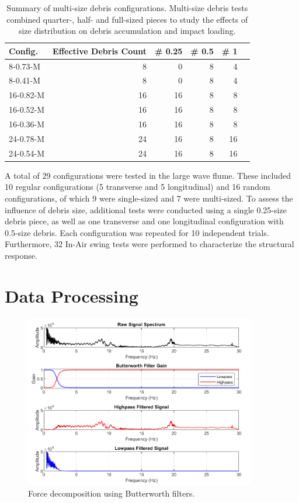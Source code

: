 \documentclass{article}
\begin{document}
{\begin{table}[h!]
\centering
\caption{Summary of multi-size debris configurations. Multi-size debris tests combined quarter-, half- and full-sized pieces to study the effects of size distribution on debris accumulation and impact loading.}
{\small
\begin{tabular}{l r r r r r}
\hline
\textbf{Config.} & \textbf{Effective Debris Count}& \textbf{\# 0.25} & \textbf{\# 0.5 } & \textbf{\# 1} \\
\hline
8-0.73-M & 8   & 0  & 8  & 4 \\
8-0.41-M & 8  & 0  & 8  & 4 \\
16-0.82-M & 16 & 16 & 8  & 8 \\
16-0.52-M & 16  & 16 & 8  & 8 \\
16-0.36-M & 16  & 16 & 8  & 8 \\
24-0.78-M & 24  & 16 & 8  & 16 \\
24-0.54-M & 24  & 16 & 8  & 16 \\
\hline
\end{tabular}
}
\label{tab:multi_size_configs}
\end{table}



A total of 29 configurations were tested in the large wave flume. These included 10 regular configurations (5 transverse and 5 longitudinal) and 16 random configurations, of which 9 were single-sized and 7 were multi-sized. To assess the influence of debris size, additional tests were conducted using a single 0.25-size debris piece, as well as one transverse and one longitudinal configuration with 0.5-size debris. Each configuration was repeated for 10 independent trials. Furthermore, 32 In-Air swing tests were performed to characterize the structural response.

\section{Data Processing}

\begin{figure}[htbp] \centering \includegraphics[width=0.9\textwidth]{high_low_pass.png} \caption{Force decomposition using Butterworth filters.} \label{fig:high_low_pass} \end{figure}

}
\end{document}
